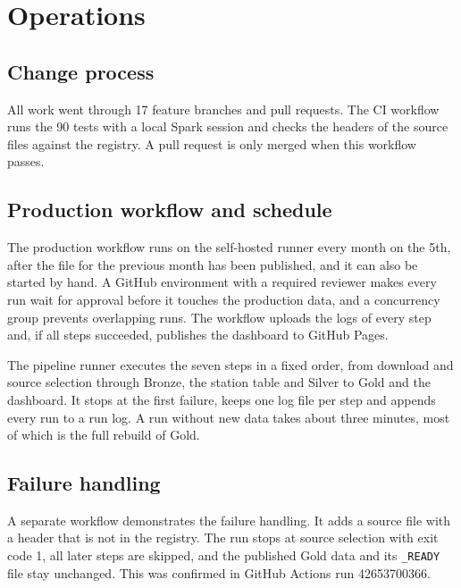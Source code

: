 \documentclass[11pt,a4paper]{article}
\newcommand{\code}[1]{\texttt{\small #1}}
\begin{document}
\section{Operations}
\label{sec:ops}

\subsection{Change process}

All work went through 17 feature branches and pull requests. The CI workflow runs the 90 tests with a local Spark session
and checks the headers of the source files against the registry. A pull request is only merged when this workflow passes.

\subsection{Production workflow and schedule}

The production workflow runs on the self-hosted runner every month on the 5th, after the file for the previous month has
been published, and it can also be started by hand. A GitHub environment with a required reviewer makes every run wait for
approval before it touches the production data, and a concurrency group prevents overlapping runs. The workflow uploads the
logs of every step and, if all steps succeeded, publishes the dashboard to GitHub Pages.

The pipeline runner executes the seven steps in a fixed order, from download and source selection through Bronze, the
station table and Silver to Gold and the dashboard. It stops at the first failure, keeps one log file per step and appends
every run to a run log. A run without new data takes about three minutes, most of which is the full rebuild of Gold.

\subsection{Failure handling}

A separate workflow demonstrates the failure handling. It adds a source file with a header that is not in the registry.
The run stops at source selection with exit code 1, all later steps are skipped, and the published Gold data and its
\code{\_READY} file stay unchanged. This was confirmed in GitHub Actions run 42653700366.

\end{document}
